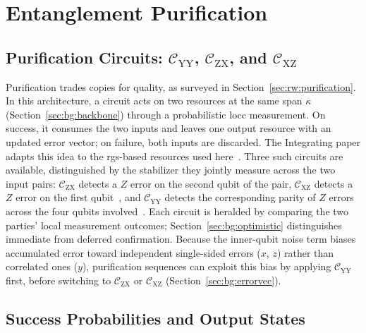 \section{Entanglement Purification}
\label{sec:bg:purification}

\subsection{Purification Circuits: \texorpdfstring{$\mathcal C_\mathrm{YY}$, $\mathcal C_\mathrm{ZX}$, and $\mathcal C_\mathrm{XZ}$}{CYY, CZX, and CXZ}}
\label{sec:bg:circuits}

Purification trades copies for quality, as surveyed in Section~\ref{sec:rw:purification}. In this architecture, a circuit acts on two resources at the same span $\kappa$ (Section~\ref{sec:bg:backbone}) through a probabilistic \gls{locc} measurement. On success, it consumes the two inputs and leaves one output resource with an updated error vector; on failure, both inputs are discarded. The Integrating paper adapts this idea to the \Gls{rgs}-based resources used here~\cite{Benchasattabuse2025Integrating}. Three such circuits are available, distinguished by the stabilizer they jointly measure across the two input pairs: $\mathcal C_\mathrm{ZX}$ detects a $Z$ error on the second qubit of the pair, $\mathcal C_\mathrm{XZ}$ detects a $Z$ error on the first qubit~\cite{Deutsch1996Quantum}, and $\mathcal C_\mathrm{YY}$ detects the corresponding parity of $Z$ errors across the four qubits involved~\cite{Benchasattabuse2025Integrating}. Each circuit is heralded by comparing the two parties' local measurement outcomes; Section~\ref{sec:bg:optimistic} distinguishes immediate from deferred confirmation. Because the inner-qubit noise term biases accumulated error toward independent single-sided errors ($x$, $z$) rather than correlated ones ($y$), purification sequences can exploit this bias by applying $\mathcal C_\mathrm{YY}$ first, before switching to $\mathcal C_\mathrm{ZX}$ or $\mathcal C_\mathrm{XZ}$ (Section~\ref{sec:bg:errorvec}).

\subsection{Success Probabilities and Output States}
\label{sec:bg:purmath}

